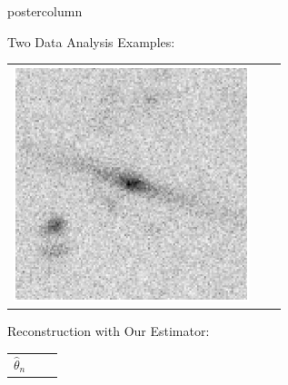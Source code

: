 \documentclass[final]{beamer}
\begin{document}
\begin{frame}
\begin{columns}
\begin{column}{.32\textwidth}
\begin{beamercolorbox}[center,wd=\textwidth]{postercolumn}
\begin{minipage}[T]{.95\textwidth}
{\begin{block}{Two Data Analysis Examples: }
\begin{table}
\begin{tabular}{c c c}
\begin{minipage}[r][2.5in][r]{5in}
                    \includegraphics[width=2.7in,trim = 120 50 120 50,clip]{./figures/galaxyPic3.eps}
                  \end{minipage}
                \end{tabular}
              \end{table}
            \end{block} 
            \begin{block}{Reconstruction with Our Estimator:}
              \begin{table}
                \centering
                \begin{tabular}{ccc}
                  \begin{minipage}[c][2.5in][c]{3cm}
                  $\hat\theta_n$ 
                  \end{minipage} &
                  \begin{minipage}[c][2.5in][c]{6in}

\end{minipage}
\end{tabular}
\end{table}
\end{block}}
\end{minipage}
\end{beamercolorbox}
\end{column}
\end{columns}
\end{frame}
\end{document}
